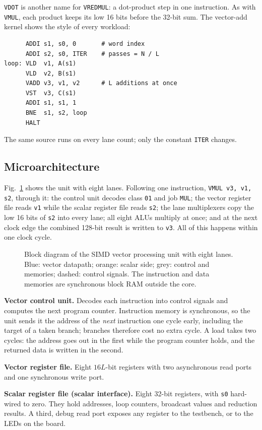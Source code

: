 \documentclass[journal]{IEEEtran}
\begin{document}
\texttt{VDOT} is another name for \texttt{VREDMUL}: a dot-product step in one
instruction. As with \texttt{VMUL}, each product keeps its low 16 bits before the
32-bit sum. The vector-add kernel shows the style of every workload:
\begin{lstlisting}
      ADDI s1, s0, 0       # word index
      ADDI s2, s0, ITER    # passes = N / L
loop: VLD  v1, A(s1)
      VLD  v2, B(s1)
      VADD v3, v1, v2      # L additions at once
      VST  v3, C(s1)
      ADDI s1, s1, 1
      BNE  s1, s2, loop
      HALT
\end{lstlisting}
The same source runs on every lane count; only the constant \texttt{ITER} changes.

\subsection{Microarchitecture}
Fig.~\ref{fig:block} shows the unit with eight lanes. Following one instruction,
\texttt{VMUL v3, v1, s2}, through it: the control unit decodes class \texttt{01} and job
\texttt{MUL}; the vector register file reads \texttt{v1} while the scalar register file
reads \texttt{s2}; the lane multiplexers copy the low 16 bits of \texttt{s2} into every
lane; all eight ALUs multiply at once; and at the next clock edge the combined 128-bit
result is written to \texttt{v3}. All of this happens within one clock cycle.

\begin{figure}[t]
\centering

\caption{Block diagram of the SIMD vector processing unit with eight lanes. Blue: vector
datapath; orange: scalar side; grey: control and memories; dashed: control signals. The
instruction and data memories are synchronous block RAM outside the core.}
\label{fig:block}
\end{figure}

\textbf{Vector control unit.} Decodes each instruction into control signals and
computes the next program counter. Instruction memory is synchronous, so the unit sends
it the address of the \emph{next} instruction one cycle early, including the target of
a taken branch; branches therefore cost no extra cycle. A load takes two cycles: the
address goes out in the first while the program counter holds, and the returned data is
written in the second.

\textbf{Vector register file.} Eight $16L$-bit registers with two asynchronous read
ports and one synchronous write port.

\textbf{Scalar register file (scalar interface).} Eight 32-bit registers, with
\texttt{s0} hard-wired to zero. They hold addresses, loop counters, broadcast values and
reduction results. A third, debug read port exposes any register to the testbench, or to
the LEDs on the board.
\end{document}
